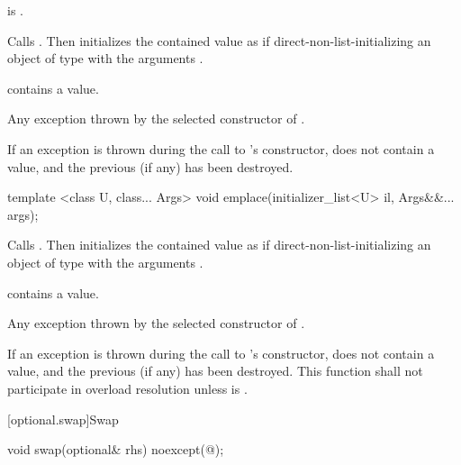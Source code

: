\begin{itemdescr}
\pnum
\requires
{} is .

\pnum
\effects
Calls . Then initializes the contained value as if direct-non-list-initializing an object of type  with the arguments .

\pnum
\postconditions
{} contains a value.

\pnum
\throws
Any exception thrown by the selected constructor of .

\pnum
\remarks
If an exception is thrown during the call to 's constructor,  does not contain a value, and the previous  (if any) has been destroyed.
\end{itemdescr}

%
\begin{itemdecl}
template <class U, class... Args> void emplace(initializer_list<U> il, Args&&... args);
\end{itemdecl}

\begin{itemdescr}
\pnum
\effects
Calls . Then initializes the contained value as if direct-non-list-initializing an object of type  with the arguments .

\pnum
\postconditions
{} contains a value.

\pnum
\throws
Any exception thrown by the selected constructor of .

\pnum
\remarks
If an exception is thrown during the call to 's constructor,  does not contain a value, and the previous  (if any) has been destroyed.
This function shall not participate in overload resolution unless  is .
\end{itemdescr}

[optional.swap]{Swap}

%
\begin{itemdecl}
void swap(optional& rhs) noexcept(@\seebelow@);
\end{itemdecl}

